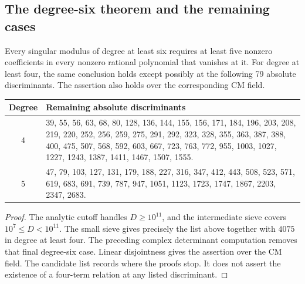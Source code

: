 \subsection{The degree-six theorem and the remaining cases}
\begin{theorem}
Every singular modulus of degree at least six requires at least five nonzero coefficients in every nonzero rational polynomial that vanishes at it. For degree at least four, the same conclusion holds except possibly at the following 79 absolute discriminants. The assertion also holds over the corresponding CM field.
\end{theorem}
\begin{center}\small
\begin{tabular}{@{}c p{.84\linewidth}@{}}
\toprule Degree & Remaining absolute discriminants \\ \midrule
4 & 39, 55, 56, 63, 68, 80, 128, 136, 144, 155, 156, 171, 184, 196, 203, 208, 219, 220, 252, 256, 259, 275, 291, 292, 323, 328, 355, 363, 387, 388, 400, 475, 507, 568, 592, 603, 667, 723, 763, 772, 955, 1003, 1027, 1227, 1243, 1387, 1411, 1467, 1507, 1555. \\
5 & 47, 79, 103, 127, 131, 179, 188, 227, 316, 347, 412, 443, 508, 523, 571, 619, 683, 691, 739, 787, 947, 1051, 1123, 1723, 1747, 1867, 2203, 2347, 2683. \\
\bottomrule\end{tabular}\end{center}
\begin{proof}
The analytic cutoff handles $D\ge10^{11}$, and the intermediate sieve covers $10^7\le D<10^{11}$. The small sieve gives precisely the list above together with $4075$ in degree at least four. The preceding complex determinant computation removes that final degree-six case. Linear disjointness gives the assertion over the CM field. The candidate list records where the proofs stop. It does not assert the existence of a four-term relation at any listed discriminant.
\end{proof}
